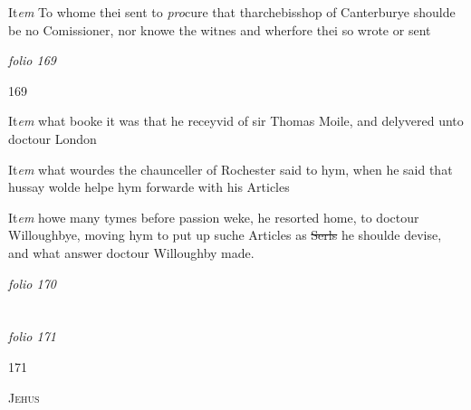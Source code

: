 \documentclass[12pt, a4paper]{book}
\begin{document}
		\ifthenelse{\isodd{\thepage}}
		{\reversemarginpar}
		{\normalmarginpar}
		It\textit{em} To whome thei sent to \textit{pro}cure that tharchebisshop of Canterburye shoulde be no Comissioner, nor knowe the witnes and wherfore thei so wrote or sent

\dotfill
						\newpage
{}

\textit{folio 169}


 	\begin{flushright}{\color{Mahogany}169}\end{flushright}
 	
		\ifthenelse{\isodd{\thepage}}
		{\reversemarginpar}
		{\normalmarginpar}
		It\textit{em} what booke it was that he receyvid of sir Thomas Moile, and  delyvered unto doctour London
 	
		\ifthenelse{\isodd{\thepage}}
		{\reversemarginpar}
		{\normalmarginpar}
		It\textit{em} what wourdes the chaunceller of Rochester said to hym, when he said that hussay wolde helpe hym forwarde with his Articles
 	
		\ifthenelse{\isodd{\thepage}}
		{\reversemarginpar}
		{\normalmarginpar}
		It\textit{em} howe many tymes before passion weke, he resorted home, to doctour Willoughbye, moving hym to put up suche Articles as \sout{Serls }
               he 
			shoulde devise, and what answer doctour Willoughby made.

\dotfill
						\newpage
{}

\textit{folio 170}


         \vspace*{4cm}
         
\dotfill
						  \section*{}  \subsection*{}

\textit{folio 171}



            		\begin{flushright}{\color{Mahogany}171}\end{flushright}
            		
				\begin{center} \begin{large} {\scshape Jehus} \end{large} \end{center}
			
\end{document}
